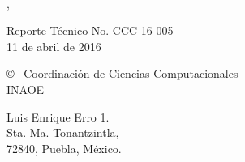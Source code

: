 \begin{titlepage}
    \begin{center}
        \mbox{ }\par
        \vspace{2.5cm}
        {\huge\bfseries\titulo\par}
        {\Large \nombre, \tutorA \par}
        \vspace{3cm}
        {\Large Reporte T\'ecnico No. CCC-16-005\\
		11 de abril de 2016 \par}
        \vspace{5cm}
        {\Large \copyright~ Coordinaci\'on de Ciencias Computacionales\\
        INAOE\par}
       \vspace{2cm}
    \end{center}
    \begin{center}
    		{\Large
        Luis Enrique Erro 1. \\ Sta. Ma. Tonantzintla, \\ 72840, Puebla, M\'exico. \par}
    \end{center}
    


\end{titlepage}

\addtolength{\hoffset}{0.5cm}
\addtolength{\voffset}{2.0cm}
\addtolength{\oddsidemargin}{-3.0cm}  